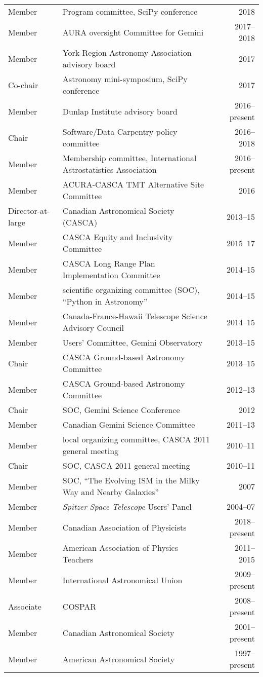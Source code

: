 \begin{tabularx}{\textwidth}{lXr}
Member & Program committee, SciPy conference & 2018\\
Member & AURA oversight Committee for Gemini & 2017--2018\\
Member & York Region Astronomy Association advisory board & 2017\\
Co-chair & Astronomy mini-symposium, SciPy conference & 2017\\
Member & Dunlap Institute advisory board & 2016--present\\
Chair & Software/Data Carpentry policy committee & 2016--2018\\
Member & Membership committee, International Astrostatistics Association & 2016--present\\
Member & ACURA-CASCA TMT Alternative Site Committee & 2016\\
Director-at-large& Canadian Astronomical Society (CASCA)& 2013--15\\
Member& CASCA Equity and Inclusivity Committee& 2015--17\\
Member& CASCA Long Range Plan Implementation Committee& 2014--15\\
Member& scientific organizing committee (SOC), ``Python in Astronomy'' & 2014--15\\
Member& Canada-France-Hawaii Telescope Science Advisory Council& 2014--15\\
Member&  Users' Committee, Gemini Observatory& 2013--15\\
Chair& CASCA Ground-based Astronomy Committee& 2013--15\\
Member& CASCA Ground-based Astronomy Committee& 2012--13\\
Chair& SOC, Gemini Science Conference& 2012\\
Member& Canadian Gemini Science Committee& 2011--13\\
Member& local organizing committee, CASCA 2011 general meeting&2010--11\\
Chair& SOC, CASCA 2011 general meeting&2010--11\\
Member& SOC, ``The Evolving ISM in the Milky Way and Nearby Galaxies'' & 2007\\
Member& {\it Spitzer Space Telescope} Users' Panel& 2004--07\\
Member& Canadian Association of Physicists& 2018--present\\
Member& American Association of Physics Teachers& 2011--2015\\
Member& International Astronomical Union& 2009--present\\
Associate& COSPAR& 2008--present\\
Member& Canadian Astronomical Society& 2001--present\\
Member& American Astronomical Society& 1997--present
\end{tabularx}
